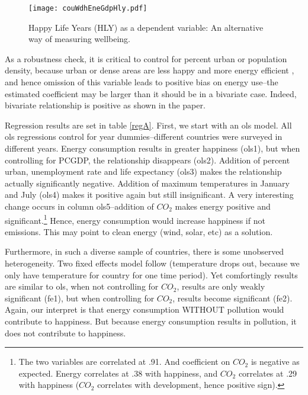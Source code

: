 \documentclass[10pt, letterpaper]{article}
\begin{document}
\begin{spacing}{1.0}
\begin{figure}[H]
 \texttt{[image: couWdhEneGdpHly.pdf]}\centering
\caption{Happy Life Years (HLY) as a dependent variable: An alternative way of
  measuring wellbeing.}\label{hly}
\end{figure}

As a robustness check, it is critical to control for percent urban or population density, because
urban or dense areas are less happy \citep{aokCityBook15} and more energy
efficient \citep{meyer13}, and hence
omission of this variable leads to positive bias on energy use--the estimated
coefficient may be larger than it should be in a bivariate case. Indeed, bivariate
relationship is positive as shown in the paper. 


Regression results are set in table \ref{regA}. First, we start with an ols
model. All ols regressions control for year dummies--different countries
were surveyed in different years. Energy consumption results in greater
happiness (ols1), but when controlling for PCGDP, the relationship disappears
(ols2). Addition of percent urban, unemployment rate and life expectancy (ols3)
makes the relationship actually significantly negative.  Addition of maximum
temperatures in January and July (ols4) makes it positive again but still
insignificant.  A very interesting change  occurs in column ols5--addition of
$CO_2$ makes energy positive and significant.\footnote{The two variables are
  correlated at .91. And coefficient on $CO_2$ is negative as expected. Energy correlates at .38
  with happiness, and $CO_2$ correlates at .29 with happiness ($CO_2$ correlates with development,  hence positive sign).}
 Hence, energy consumption would increase happiness if not emissions. This may
 point to clean energy (wind, solar, etc) as a solution. 

Furthermore, in such a diverse sample of countries, there is some unobserved
heterogeneity. Two fixed effects model follow (temperature drops out, because we
 only have temperature for country for one time period). Yet comfortingly
 results are similar to ols, when not controlling for $CO_2$, results are only weakly
 significant (fe1), but when controlling for $CO_2$,  results become significant
 (fe2). Again, our interpret is that energy consumption WITHOUT pollution would
 contribute to happiness.  But because energy consumption results in pollution,
 it does not contribute to happiness.


\end{spacing}
\end{document}
